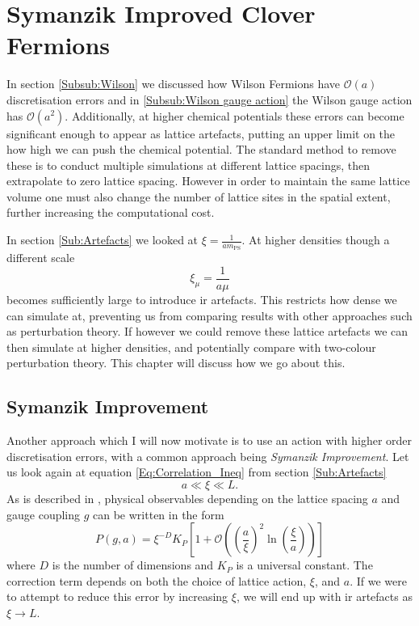 \chapter[Clover Fermions]{Symanzik Improved Clover Fermions}\label{Chap:Clover}
	In section \ref{Subsub:Wilson} we discussed how Wilson Fermions have $\mathscr{O}(a)$ discretisation errors and in
	\ref{Subsub:Wilson gauge action} the Wilson gauge action has $\mathscr{O}\left(a^2\right)$. Additionally, at higher
	chemical potentials these errors can become significant enough to appear as lattice artefacts, putting an upper limit
	on the how high we can push the chemical potential. The standard method to remove these is to conduct multiple
	simulations at different lattice spacings, then extrapolate to zero lattice spacing. However in order to maintain the
	same lattice volume one must also change the number of lattice sites in the spatial extent, further increasing the
	computational cost.

	In section \ref{Sub:Artefacts} we looked at $\xi=\frac{1}{a m_\text{PS}}$. At higher densities though a
	different scale
	\begin{equation}\label{Eq:Dense_Scale}
		\xi_\mu=\frac{1}{a\mu}
	\end{equation}
	becomes sufficiently large to introduce \acrshort{ir} artefacts. This restricts how dense we can simulate at,
	preventing us from comparing results with other approaches such as perturbation theory. If however we could remove
	these lattice artefacts we can then simulate at higher densities, and potentially compare with two-colour
	perturbation theory. This chapter will discuss how we go about this.
\section{Symanzik Improvement}\label{Sec:Symanzik}
	Another approach which I will now motivate is to use an action with higher order discretisation errors, with a common
	approach being \emph{Symanzik Improvement}\cite{Symanzik:1983dc,Symanzik:1983gh}. Let us
	look again at equation \eqref{Eq:Correlation_Ineq} from section \ref{Sub:Artefacts} $$a\ll\xi\ll L\text{.}$$
	As is described in \cite{Symanzik:1983dc}, physical observables depending on the lattice spacing $a$ and gauge
	coupling $g$ can be written in the form
	\begin{equation}\label{Eq:Phys_Symanzik}
		P(g,a)=\xi^{-D}
		K_P\left[1+\mathscr{O}\left(\left(\frac{a}{\xi}\right)^2\ln\left(\frac{\xi}{a}\right)\right)\right]
	\end{equation}
	where $D$ is the number of dimensions and $K_P$ is a universal constant. The correction term depends on both the
	choice of lattice action, $\xi$, and $a$. If we were to attempt to reduce this error by increasing $\xi$, we will end
	up with \acrshort{ir} artefacts as $\xi\rightarrow L$.

